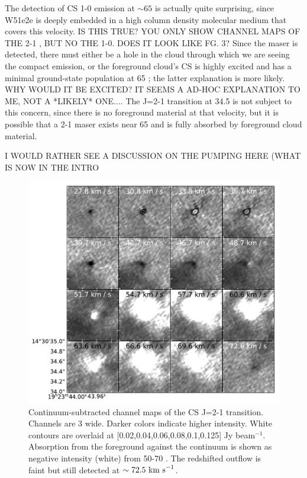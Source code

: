 \documentclass[twocolumn]{aastex62}
\begin{document}
The detection of CS 1-0 emission at $\sim65$ \kms is actually quite surprising,
since W51e2e is deeply embedded in a high column density molecular medium that
covers this velocity.  
{\color{red} IS THIS TRUE? YOU ONLY SHOW  CHANNEL MAPS OF THE 2-1 , BUT NO THE 1-0. DOES IT LOOK LIKE FG. 3?}
Since the maser is detected, there must either be a hole
in the cloud through which we are seeing the compact emission, or the
foreground cloud's CS
is highly excited and has a minimal ground-state population at 65 \kms; the
latter explanation is more likely. 
{\color{red} WHY WOULD IT BE EXCITED? IT SEEMS A AD-HOC EXPLANATION TO ME, NOT A *LIKELY* ONE....}
The J=2-1 transition at 34.5 \kms is not
subject to this concern, since there is no foreground material at that
velocity, but it is possible that a 2-1 maser exists near 65 \kms and is fully
absorbed by foreground cloud material.

{\color{red}
I WOULD RATHER SEE A DISCUSSION ON THE PUMPING HERE (WHAT IS NOW IN THE INTRO} 


\begin{figure}
    \includegraphics[]{figures/CS_maser_channel_maps.pdf}
    \caption{Continuum-subtracted channel maps of the CS J=2-1 transition.
    Channels are 3 \kms wide.  Darker colors indicate higher intensity.  White
    contours are overlaid at [0.02,0.04,0.06,0.08,0.1,0.125] Jy beam$^{-1}$.
    Absorption from the foreground against the continuum is shown as negative
    intensity (white) from 50-70 \kms.  The redshifted outflow is faint but
    still detected at ${\sim72.5~\textrm{km~s}^{-1}}$.
    }
    \label{fig:channelmaps}
\end{figure}
\end{document}
